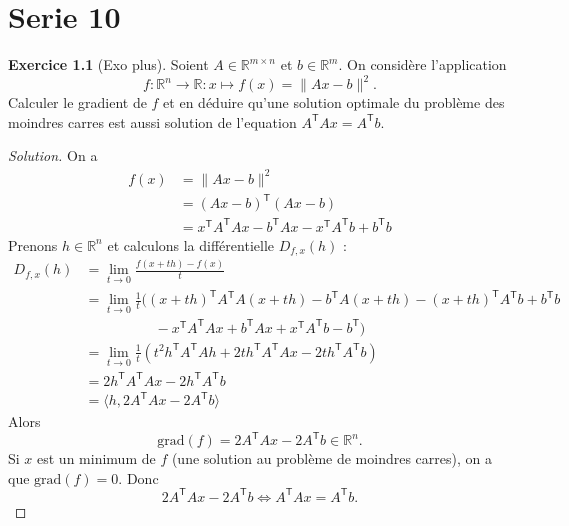 \documentclass[a4paper,12pt,french]{report}
\theoremstyle{plain}
\theoremstyle{definition}
\newtheorem{exercise}{Exercice}[chapter]
\begin{document}
\chapter{Serie 10}
\begin{exercise}[Exo plus]
Soient $A\in \mathbb{R}^{m\times n}$ et $b\in \mathbb{R}^{m}$. On considère l'application
$$
f:\mathbb{R}^{n}\to \mathbb{R}:x\mapsto f(x)=\lVert Ax- b\rVert^{2} .
$$
Calculer le gradient de $f$ et en déduire qu'une solution optimale du problème des moindres carres est aussi solution de l'equation $A^{\mathsf{T}}Ax=A^{\mathsf{T}}b$.
\end{exercise}
\begin{proof}[Solution]
On a
\begin{align*}
f(x) & =\lVert Ax-b \rVert ^{2} \\
 & =(Ax-b)^{\mathsf{T}}(Ax-b) \\
 & =x^{\mathsf{T}}A^{\mathsf{T}}Ax-b^{\mathsf{T}}Ax-x^{\mathsf{T}}A^{\mathsf{T}}b +b^{\mathsf{T}}b
\end{align*}
Prenons $h\in \mathbb{R}^{n}$ et calculons la différentielle $D_{f,x}(h)$ :
\begin{align*}
D_{f,x}(h) &=\lim_{ t \to 0 } \frac{f(x+th)-f(x)}{t} \\
 & =\lim_{ t \to 0 } \frac{1}{t}((x+th)^{\mathsf{T}}A^{\mathsf{T}}A(x+th)-b^{\mathsf{T}}A(x+th)-(x+th)^{\mathsf{T}}A^{\mathsf{T}}b+b^{\mathsf{T}}b \\
 & \quad\quad \quad\quad\quad -x^{\mathsf{T}}A^{\mathsf{T}}Ax+b^{\mathsf{T}}Ax+x^{\mathsf{T}}A^{\mathsf{T}}b -b^{\mathsf{T}} ) \\
 & = \lim_{ t \to 0 } \frac{1}{t} (t^{2}h^{\mathsf{T}}A^{\mathsf{T}}Ah+2th^{\mathsf{T}}A^{\mathsf{T}}Ax-2th^{\mathsf{T}}A^{\mathsf{T}}b) \\
 & =2h^{\mathsf{T}}A^{\mathsf{T}}Ax-2h^{\mathsf{T}}A^{\mathsf{T}}b \\
 & =\langle h,2A^{\mathsf{T}}Ax-2A^{\mathsf{T}}b \rangle 
\end{align*}
Alors 
$$
\mathrm{grad}(f)=2A^{\mathsf{T}}Ax-2A^{\mathsf{T}}b\in \mathbb{R}^{n}.
$$
Si $x$ est un minimum de $f$ (une solution au problème de moindres carres), on a que $\mathrm{grad}(f)=0$. Donc
$$
2A^{\mathsf{T}}Ax-2A^{\mathsf{T}}b \Leftrightarrow A^{\mathsf{T}}Ax=A^{\mathsf{T}}b.
$$
\end{proof}
\end{document}
